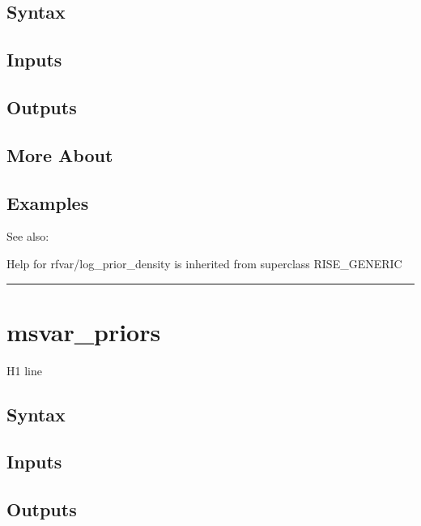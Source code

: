 \documentclass[letterpaper,10pt,english]{sphinxmanual}
\begin{document}
\subsection{Syntax}
\label{classes/models/@rfvar/rfvar:id68}

\subsection{Inputs}
\label{classes/models/@rfvar/rfvar:id69}

\subsection{Outputs}
\label{classes/models/@rfvar/rfvar:id70}

\subsection{More About}
\label{classes/models/@rfvar/rfvar:id71}

\subsection{Examples}
\label{classes/models/@rfvar/rfvar:id72}
See also:

Help for rfvar/log\_prior\_density is inherited from superclass RISE\_GENERIC


\bigskip\hrule{}\bigskip



\section{msvar\_priors}
\label{classes/models/@rfvar/rfvar:id73}\label{classes/models/@rfvar/rfvar:msvar-priors}
H1 line


\subsection{Syntax}
\label{classes/models/@rfvar/rfvar:id74}

\subsection{Inputs}
\label{classes/models/@rfvar/rfvar:id75}

\subsection{Outputs}
\label{classes/models/@rfvar/rfvar:id76}
\end{document}
